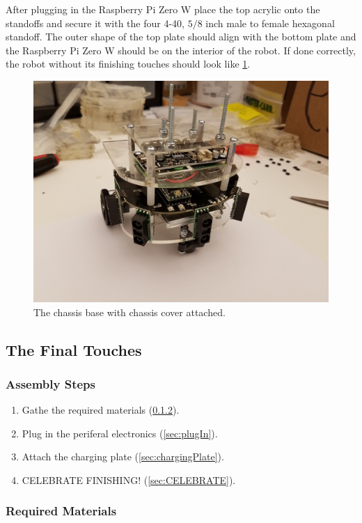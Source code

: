 After plugging in the Raspberry Pi Zero W place the top acrylic onto the standoffs and secure it with the four 4-40, $5/8$ inch male to female hexagonal standoff. The outer shape of the top plate should align with the bottom plate and the Raspberry Pi Zero W should be on the interior of the robot. If done correctly, the robot without its finishing touches should look like \cref{fig:nearFinalChassis}.

\begin{figure}[h!]
\centering
\includegraphics[width=0.65\columnwidth, keepaspectratio]{./figs/20190107_092811.jpg}
\caption{The chassis base with chassis cover attached.}
\label{fig:nearFinalChassis}
\end{figure}

\subsection{The Final Touches}
\label{sec:finalTouch}

\subsubsection{Assembly Steps}
\label{sec:finalAssembly}

\begin{enumerate}
\item Gathe the required materials (\cref{sec:finalMaterials}).
\item Plug in the periferal electronics (\cref{sec:plugIn}).
\item Attach the charging plate (\cref{sec:chargingPlate}).
\item CELEBRATE FINISHING! (\cref{sec:CELEBRATE}).
\end{enumerate}

\subsubsection{Required Materials}
\label{sec:finalMaterials}

